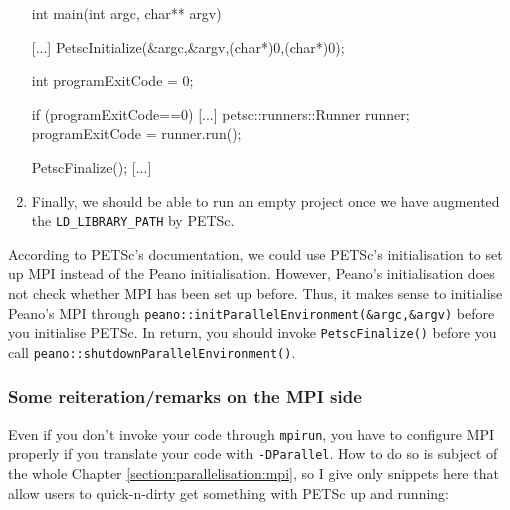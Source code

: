 \begin{enumerate}
\begin{code}
[...]

int main(int argc, char** argv) {
  [...]
  PetscInitialize(&argc,&argv,(char*)0,(char*)0);

  int programExitCode = 0;

  if (programExitCode==0) {
    [...]
    petsc::runners::Runner runner;
    programExitCode = runner.run();
  }

  PetscFinalize();
  [...]
}  
  \end{code}
  \item Finally, we should be able to run an empty project once we have
  augmented the \texttt{LD\_LIBRARY\_PATH} by PETSc.
\end{enumerate}
  

\begin{remark}
   According to PETSc's documentation, we could use PETSc's initialisation to
   set up MPI instead of the Peano initialisation. However, Peano's
   initialisation does not check whether MPI has been set up before. 
   Thus, it makes sense to initialise Peano's MPI through
   \texttt{peano::initParallelEnvironment(\&argc,\&argv)} before you initialise
   PETSc. In return, you should invoke \texttt{PetscFinalize()} before you call
   \texttt{peano::shutdownParallelEnvironment()}.
\end{remark}


\subsubsection*{Some reiteration/remarks on the MPI side}

Even if you don't invoke your code through \texttt{mpirun}, you have to
configure MPI properly if you translate your code with \texttt{-DParallel}.
How to do so is subject of the whole Chapter \ref{section:parallelisation:mpi},
so I give only snippets here that allow users to quick-n-dirty get something
with PETSc up and running:

